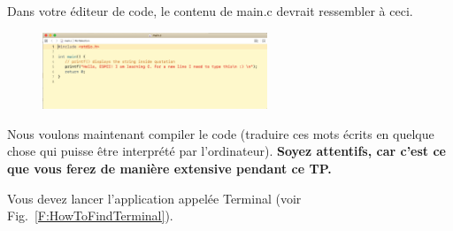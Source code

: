 \documentclass{article}
\newcommand\fig[1]{{Fig.~\ref{#1}}}
\begin{document}
Dans votre éditeur de code, le contenu de main.c devrait ressembler à ceci.
\begin{figure}[H]
\center
\includegraphics[width=0.6\textwidth]{Plots/ContentMain.png}
\end{figure}
Nous voulons maintenant compiler le code (traduire ces mots écrits en quelque chose qui puisse être interprété par l'ordinateur). {\color{Bittersweet}\textbf{Soyez attentifs, car c'est ce que vous ferez de manière extensive pendant ce TP.}}

Vous devez lancer l'application appelée Terminal (voir \fig{F:HowToFindTerminal}).
\end{document}
